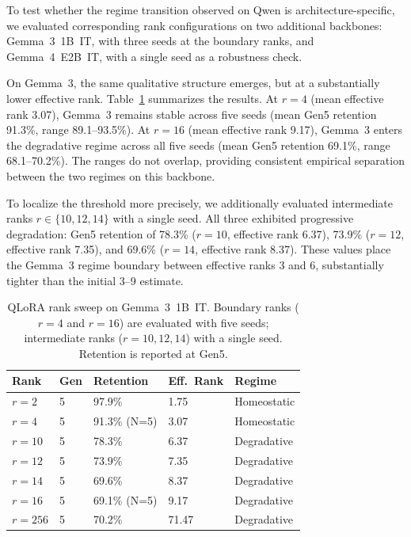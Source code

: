 \documentclass[a4paper,fleqn]{cas-dc}
\begin{document}
To test whether the regime transition observed on Qwen is architecture-specific,
we evaluated corresponding rank configurations on two additional backbones:
Gemma~3~1B~IT, with three seeds at the boundary ranks, and Gemma~4~E2B~IT, with
a single seed as a robustness check.

On Gemma~3, the same qualitative structure emerges, but at a substantially lower
effective rank. Table~\ref{tab:gemma3} summarizes the results. At $r=4$ (mean
effective rank 3.07), Gemma~3 remains stable across five seeds (mean Gen5
retention 91.3\%, range 89.1--93.5\%). At $r=16$ (mean effective rank 9.17),
Gemma~3 enters the degradative regime across all five seeds (mean Gen5 retention
69.1\%, range 68.1--70.2\%). The ranges do not overlap, providing consistent
empirical separation between the two regimes on this backbone.

To localize the threshold more precisely, we additionally evaluated intermediate
ranks $r \in \{10, 12, 14\}$ with a single seed. All three exhibited progressive
degradation: Gen5 retention of 78.3\% ($r=10$, effective rank 6.37), 73.9\%
($r=12$, effective rank 7.35), and 69.6\% ($r=14$, effective rank 8.37). These
values place the Gemma~3 regime boundary between effective ranks 3 and 6,
substantially tighter than the initial 3--9 estimate.

\begin{table}[width=.95\linewidth,cols=5,pos=htbp]
\caption{QLoRA rank sweep on Gemma~3~1B~IT. Boundary ranks ($r=4$ and $r=16$)
are evaluated with five seeds; intermediate ranks ($r=10,12,14$) with a single
seed. Retention is reported at Gen5.}\label{tab:gemma3}
\begin{tabular*}{\tblwidth}{@{} lllll@{} }
\toprule
Rank & Gen & Retention & Eff.\ Rank & Regime \\
\midrule
$r=2$   & 5 & 97.9\%       & 1.75  & Homeostatic \\
$r=4$   & 5 & 91.3\% (N=5) & 3.07  & Homeostatic \\
$r=10$  & 5 & 78.3\%       & 6.37  & Degradative \\
$r=12$  & 5 & 73.9\%       & 7.35  & Degradative \\
$r=14$  & 5 & 69.6\%       & 8.37  & Degradative \\
$r=16$  & 5 & 69.1\% (N=5) & 9.17  & Degradative \\
$r=256$ & 5 & 70.2\%       & 71.47 & Degradative \\
\bottomrule
\end{tabular*}
\end{table}
\end{document}
